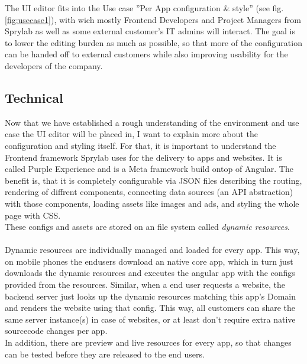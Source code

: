 The UI editor fits into the Use case ''Per App configuration \& style'' (see fig. \ref*{fig:usecase1}), with wich mostly Frontend Developers and Project Managers from Sprylab as well as some external customer's IT admins will interact. The goal is to lower the editing burden as much as possible, so that more of the configuration can be handed off to external customers while also improving usability for the developers of the company.

\subsection{Technical}
Now that we have established a rough understanding of the environment and use case the UI editor will be placed in, I want to explain more about the configuration and styling itself.
For that, it is important to understand the Frontend framework Sprylab uses for the delivery to apps and websites. It is called Purple Experience and is a Meta framework build ontop of Angular. The benefit is, that it is completely configurable via JSON files describing the routing, rendering of diffrent components,
connecting data sources (an API abstraction) with those components, loading assets like images and ads, and styling the whole page with CSS.
\\
These configs and assets are stored on an file system called \label{def:DynamicResources} \textit{dynamic resources}.
\\\\
Dynamic resources are individually managed and loaded for every app. This way, on mobile phones the endusers download an native core app, which in turn just downloads the dynamic resources and executes the angular app with the configs provided from the resources.
Similar, when a end user requests a website, the backend server just looks up the dynamic resources matching this app's Domain and renders the website using that config.
This way, all customers can share the same server instance(s) in case of websites, or at least don't require extra native sourcecode changes per app.
\\
In addition, there are preview and live resources for every app, so that changes can be tested before they are released to the end users.

